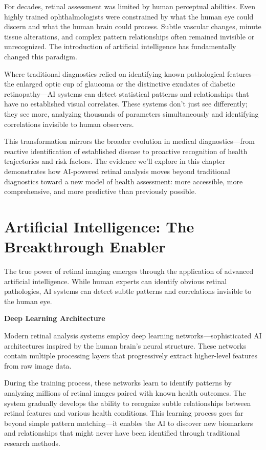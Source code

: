 \documentclass[
  Letterpaper,
]{scrbook}
\begin{document}
For decades, retinal assessment was limited by human perceptual
abilities. Even highly trained ophthalmologists were constrained by what
the human eye could discern and what the human brain could process.
Subtle vascular changes, minute tissue alterations, and complex pattern
relationships often remained invisible or unrecognized. The introduction
of artificial intelligence has fundamentally changed this paradigm.

Where traditional diagnostics relied on identifying known pathological
features---the enlarged optic cup of glaucoma or the distinctive
exudates of diabetic retinopathy---AI systems can detect statistical
patterns and relationships that have no established visual correlates.
These systems don't just see differently; they see more, analyzing
thousands of parameters simultaneously and identifying correlations
invisible to human observers.

This transformation mirrors the broader evolution in medical
diagnostics---from reactive identification of established disease to
proactive recognition of health trajectories and risk factors. The
evidence we'll explore in this chapter demonstrates how AI-powered
retinal analysis moves beyond traditional diagnostics toward a new model
of health assessment: more accessible, more comprehensive, and more
predictive than previously possible.

\section{Artificial Intelligence: The Breakthrough
Enabler}\label{artificial-intelligence-the-breakthrough-enabler}

The true power of retinal imaging emerges through the application of
advanced artificial intelligence. While human experts can identify
obvious retinal pathologies, AI systems can detect subtle patterns and
correlations invisible to the human eye.

\textbf{Deep Learning Architecture}

Modern retinal analysis systems employ deep learning
networks---sophisticated AI architectures inspired by the human brain's
neural structure. These networks contain multiple processing layers that
progressively extract higher-level features from raw image data.

During the training process, these networks learn to identify patterns
by analyzing millions of retinal images paired with known health
outcomes. The system gradually develops the ability to recognize subtle
relationships between retinal features and various health conditions.
This learning process goes far beyond simple pattern matching---it
enables the AI to discover new biomarkers and relationships that might
never have been identified through traditional research methods.
\end{document}
